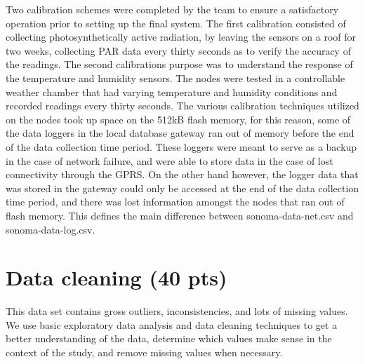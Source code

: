 \documentclass[11pt]{article}
\begin{document}
\begin{enumerate}[label=(\alph*)]
Two calibration schemes were completed by the team to ensure a satisfactory operation prior to setting up the final system. The first calibration consisted of collecting photosynthetically active radiation, by leaving the sensors on a roof for two weeks, collecting PAR data every thirty seconds as to verify the accuracy of the readings. The second calibrations purpose was to understand the response of the temperature and humidity sensors. The nodes were tested in a controllable weather chamber that had varying temperature and humidity conditions and recorded readings every thirty seconds. The various calibration techniques utilized on the nodes took up space on the 512kB flash memory, for this reason, some of the data loggers in the local database gateway ran out of memory before the end of the data collection time period. These loggers were meant to serve as a backup in the case of network failure, and were able to store data in the case of lost connectivity through the GPRS. On the other hand however, the logger data that was stored in the gateway could only be accessed at the end of the data collection time period, and there was lost information amongst the nodes that ran out of flash memory. This defines the main difference between sonoma-data-net.csv and sonoma-data-log.csv.

\end{enumerate}

\section{Data cleaning (40 pts)}

This data set contains gross outliers, inconsistencies, and lots of missing values. We use basic exploratory data analysis and data cleaning techniques to get a better understanding of the data, determine which values make sense in the context of the study, and remove missing values when necessary.
\end{document}
